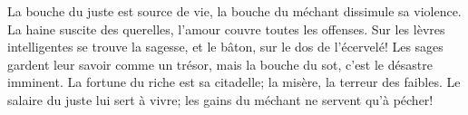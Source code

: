 La bouche du juste est source de vie,
	la bouche du méchant dissimule sa violence.
La haine suscite des querelles,
	l’amour couvre toutes les offenses.
Sur les lèvres intelligentes se trouve la sagesse,
	et le bâton, sur le dos de l’écervelé!
Les sages gardent leur savoir comme un trésor,
	mais la bouche du sot, c’est le désastre imminent.
La fortune du riche est sa citadelle;
	la misère, la terreur des faibles.
Le salaire du juste lui sert à vivre;
	les gains du méchant ne servent qu’à pécher!
